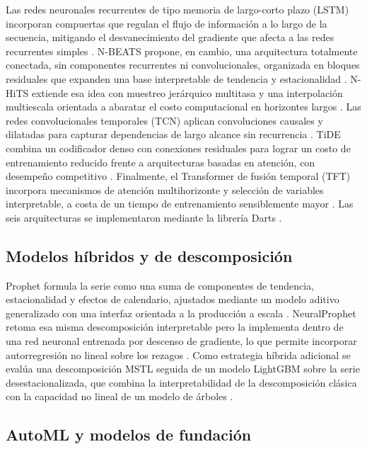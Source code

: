Las redes neuronales recurrentes de tipo memoria de largo-corto plazo (LSTM) incorporan compuertas que
regulan el flujo de información a lo largo de la secuencia, mitigando el desvanecimiento del gradiente que
afecta a las redes recurrentes simples \parencite{hochreiter1997lstm}. N-BEATS propone, en cambio, una
arquitectura totalmente conectada, sin componentes recurrentes ni convolucionales, organizada en bloques
residuales que expanden una base interpretable de tendencia y estacionalidad \parencite{oreshkin2020nbeats}.
N-HiTS extiende esa idea con muestreo jerárquico multitasa y una interpolación multiescala orientada a
abaratar el costo computacional en horizontes largos \parencite{challu2023nhits}. Las redes convolucionales
temporales (TCN) aplican convoluciones causales y dilatadas para capturar dependencias de largo alcance sin
recurrencia \parencite{bai2018tcn}. TiDE combina un codificador denso con conexiones residuales para lograr
un costo de entrenamiento reducido frente a arquitecturas basadas en atención, con desempeño competitivo
\parencite{das2023tide}. Finalmente, el Transformer de fusión temporal (TFT) incorpora mecanismos de
atención multihorizonte y selección de variables interpretable, a costa de un tiempo de entrenamiento
sensiblemente mayor \parencite{lim2021tft}. Las seis arquitecturas se implementaron mediante la librería
Darts \parencite{herzen2022darts}.

\subsection{Modelos híbridos y de descomposición}

Prophet formula la serie como una suma de componentes de tendencia, estacionalidad y efectos de
calendario, ajustados mediante un modelo aditivo generalizado con una interfaz orientada a la producción a
escala \parencite{taylor2018prophet}. NeuralProphet retoma esa misma descomposición interpretable pero la
implementa dentro de una red neuronal entrenada por descenso de gradiente, lo que permite incorporar
autorregresión no lineal sobre los rezagos \parencite{triebe2021neuralprophet}. Como estrategia híbrida
adicional se evalúa una descomposición MSTL seguida de un modelo LightGBM sobre la serie
desestacionalizada, que combina la interpretabilidad de la descomposición clásica con la capacidad no
lineal de un modelo de árboles \parencite{hyndman2021,ke2017lightgbm}.

\subsection{AutoML y modelos de fundación}

